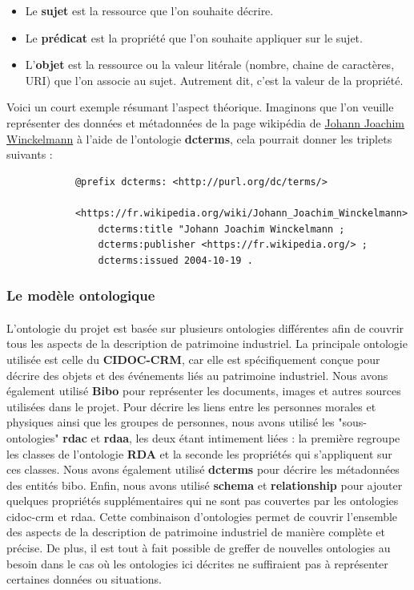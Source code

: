 \begin{itemize}
    \item[\ding{103}] Le \textbf{sujet} est la ressource que l'on souhaite décrire.
    \item[\ding{103}] Le \textbf{prédicat} est la propriété que l'on souhaite appliquer sur le sujet.
    \item[\ding{103}] L'\textbf{objet} est la ressource ou la valeur litérale (nombre, chaine de caractères, URI) que l'on associe au sujet. Autrement dit, c'est la valeur de la propriété.
\end{itemize}

Voici un court exemple résumant l'aspect théorique. Imaginons que l'on veuille représenter des données et métadonnées de la page wikipédia de \href{https://fr.wikipedia.org/wiki/Johann_Joachim_Winckelmann}{Johann Joachim Winckelmann} à l'aide de l'ontologie \textbf{dcterms}, cela pourrait donner les triplets suivants :
            \begin{verbatim}
            @prefix dcterms: <http://purl.org/dc/terms/>
            
            <https://fr.wikipedia.org/wiki/Johann_Joachim_Winckelmann>
                dcterms:title "Johann Joachim Winckelmann ;
                dcterms:publisher <https://fr.wikipedia.org/> ;
                dcterms:issued 2004-10-19 .
            \end{verbatim}

\subsubsection{Le modèle ontologique}
\paragraph{} \hspace{10mm}
L'ontologie du projet est basée sur plusieurs ontologies différentes afin de couvrir tous les aspects de la description de patrimoine industriel. La principale ontologie utilisée est celle du \textbf{CIDOC-CRM}, car elle est spécifiquement conçue pour décrire des objets et des événements liés au patrimoine industriel. Nous avons également utilisé  \textbf{Bibo} pour représenter les documents, images et autres sources utilisées dans le projet. Pour décrire les liens entre les personnes morales et physiques ainsi que les groupes de personnes, nous avons utilisé les "sous-ontologies" \textbf{rdac} et \textbf{rdaa}, les deux étant intimement liées : la première regroupe les classes de l'ontologie \textbf{RDA} et la seconde les propriétés qui s'appliquent sur ces classes. Nous avons également utilisé \textbf{dcterms} pour décrire les métadonnées des entités bibo. Enfin, nous avons utilisé \textbf{schema} et \textbf{relationship} pour ajouter quelques propriétés supplémentaires qui ne sont pas couvertes par les ontologies cidoc-crm et rdaa. Cette combinaison d'ontologies permet de couvrir l'ensemble des aspects de la description de patrimoine industriel de manière complète et précise. De plus, il est tout à fait possible de greffer de nouvelles ontologies au besoin dans le cas où les ontologies ici décrites ne suffiraient pas à représenter certaines données ou situations.
